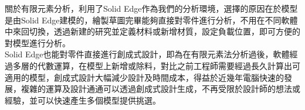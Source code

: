 關於有限元素分析，利用了Solid Edge作為我們的分析環境，選擇的原因在於模型是由Solid Edge建模的，繪製草圖完畢能夠直接對零件進行分析，不用在不同軟體中來回切換，透過新建的研究並定義材料或新增材質，設定負載位置，即可方便的對模型進行分析。\\

Solid Edge也能對零件直接進行創成式設計，即為在有限元素法分析過後，軟體經過多層的代數運算，在模型上新增或除料，對比之前工程師需要經過長久計算出可適用的模型，創成式設計大幅減少設計及時間成本，得益於近幾年電腦快速的發展，複雜的運算及設計通通可以透過創成式設計生成，不再受限於設計師的想法或經驗，並可以快速產生多個模型提供挑選。\\

\newpage
